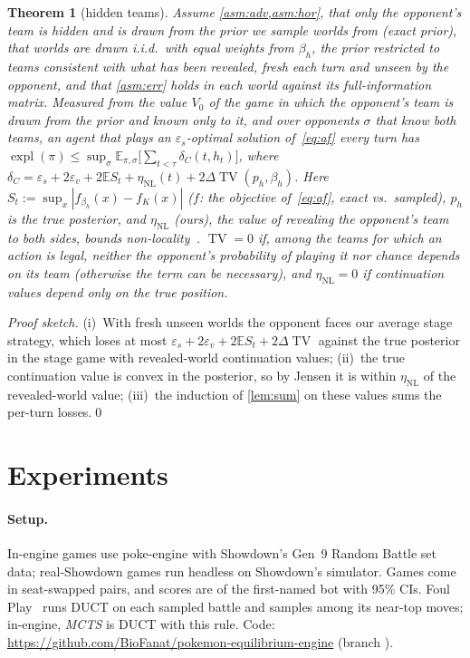 \documentclass[10pt]{article}
\theoremstyle{tplain}
\newtheorem{theorem}{Theorem}
\theoremstyle{tdef}
\theoremstyle{trem}
\newcommand{\E}{\mathbb{E}}
\newcommand{\epss}{\varepsilon_s}
\newcommand{\epsv}{\varepsilon_v}
\newcommand{\etaNL}{\eta_{\mathrm{NL}}}
\DeclareMathOperator{\expl}{expl}
\DeclareMathOperator{\TV}{TV}
\begin{document}
\begin{theorem}[hidden teams]\label{thm:C}
Assume \cref{asm:adv,asm:hor}, that only the opponent's team is hidden and is drawn from the prior we sample worlds from (exact prior), that worlds are drawn i.i.d.\ with equal weights from $\beta_h$, the prior restricted to teams consistent with what has been revealed, fresh each turn and unseen by the opponent, and that \cref{asm:err} holds in each world against its full-information matrix. Measured from the value $V_0$ of the game in which the opponent's team is drawn from the prior and known only to it, and over opponents $\sigma$ that know both teams, an agent that plays an $\epss$-optimal solution of~\eqref{eq:af} every turn has $\expl(\pi)\le\sup_\sigma\E_{\pi,\sigma}\big[\sum_{t<\tau}\delta_C(t,h_t)\big]$, where $\delta_C=\epss+2\epsv+2\E S_t+\etaNL(t)+2\Delta\TV(p_{h},\beta_{h})$. Here $S_t:=\sup_x|f_{\beta_h}(x)-f_K(x)|$ ($f$: the objective of~\eqref{eq:af}, exact vs.\ sampled), $p_h$ is the true posterior, and $\etaNL$ (ours), the value of revealing the opponent's team to both sides, bounds non-locality~\cite{Lon10}. $\TV=0$ if, among the teams for which an action is legal, neither the opponent's probability of playing it nor chance depends on its team (otherwise the term can be necessary), and $\etaNL=0$ if continuation values depend only on the true position.
\end{theorem}
\emph{Proof sketch.} (i)~With fresh unseen worlds the opponent faces our average stage strategy, which loses at most $\epss+2\epsv+2\E S_t+2\Delta\TV$ against the true posterior in the stage game with revealed-world continuation values; (ii)~the true continuation value is convex in the posterior, so by Jensen it is within $\etaNL$ of the revealed-world value; (iii)~the induction of \cref{lem:sum} on these values sums the per-turn losses.\qed

\section{Experiments}
\label{sec:exp}
\paragraph{Setup.} In-engine games use poke-engine with Showdown's Gen~9 Random Battle set data; real-Showdown games run headless on Showdown's simulator. Games come in seat-swapped pairs, and scores are of the first-named bot with 95\% CIs. Foul Play~\cite{foulplay} runs DUCT on each sampled battle and samples among its near-top moves; in-engine, \emph{MCTS} is DUCT with this rule. Code: \url{https://github.com/BioFanat/pokemon-equilibrium-engine} (branch ).
\end{document}
